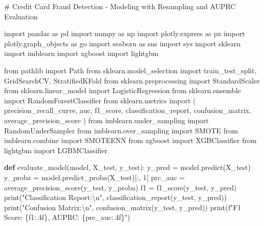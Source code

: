 \documentclass[
  letterpaper,
  DIV=11,
  numbers=noendperiod]{scrartcl}
\newenvironment{Shaded}{\begin{snugshade}}{\end{snugshade}}
\newcommand{\BuiltInTok}[1]{\textcolor[rgb]{0.00,0.23,0.31}{#1}}
\newcommand{\CharTok}[1]{\textcolor[rgb]{0.13,0.47,0.30}{#1}}
\newcommand{\CommentTok}[1]{\textcolor[rgb]{0.37,0.37,0.37}{#1}}
\newcommand{\DecValTok}[1]{\textcolor[rgb]{0.68,0.00,0.00}{#1}}
\newcommand{\ImportTok}[1]{\textcolor[rgb]{0.00,0.46,0.62}{#1}}
\newcommand{\KeywordTok}[1]{\textcolor[rgb]{0.00,0.23,0.31}{\textbf{#1}}}
\newcommand{\NormalTok}[1]{\textcolor[rgb]{0.00,0.23,0.31}{#1}}
\newcommand{\OperatorTok}[1]{\textcolor[rgb]{0.37,0.37,0.37}{#1}}
\newcommand{\SpecialCharTok}[1]{\textcolor[rgb]{0.37,0.37,0.37}{#1}}
\newcommand{\SpecialStringTok}[1]{\textcolor[rgb]{0.13,0.47,0.30}{#1}}
\newcommand{\StringTok}[1]{\textcolor[rgb]{0.13,0.47,0.30}{#1}}
\begin{document}
\begin{Shaded}
\begin{Highlighting}[]
\CommentTok{\# Credit Card Fraud Detection {-} Modeling with Resampling and AUPRC Evaluation}

\ImportTok{import}\NormalTok{ pandas }\ImportTok{as}\NormalTok{ pd}
\ImportTok{import}\NormalTok{ numpy }\ImportTok{as}\NormalTok{ np}
\ImportTok{import}\NormalTok{ plotly.express }\ImportTok{as}\NormalTok{ px}
\ImportTok{import}\NormalTok{ plotly.graph\_objects }\ImportTok{as}\NormalTok{ go}
\ImportTok{import}\NormalTok{ seaborn }\ImportTok{as}\NormalTok{ sns}
\ImportTok{import}\NormalTok{ sys}
\ImportTok{import}\NormalTok{ sklearn}
\ImportTok{import}\NormalTok{ imblearn}
\ImportTok{import}\NormalTok{ xgboost}
\ImportTok{import}\NormalTok{ lightgbm}

\ImportTok{from}\NormalTok{ pathlib }\ImportTok{import}\NormalTok{ Path}
\ImportTok{from}\NormalTok{ sklearn.model\_selection }\ImportTok{import}\NormalTok{ train\_test\_split, GridSearchCV, StratifiedKFold}
\ImportTok{from}\NormalTok{ sklearn.preprocessing }\ImportTok{import}\NormalTok{ StandardScaler}
\ImportTok{from}\NormalTok{ sklearn.linear\_model }\ImportTok{import}\NormalTok{ LogisticRegression}
\ImportTok{from}\NormalTok{ sklearn.ensemble }\ImportTok{import}\NormalTok{ RandomForestClassifier}
\ImportTok{from}\NormalTok{ sklearn.metrics }\ImportTok{import}\NormalTok{ (}
\NormalTok{    precision\_recall\_curve, auc, f1\_score, classification\_report, }
\NormalTok{    confusion\_matrix, average\_precision\_score}
\NormalTok{)}
\ImportTok{from}\NormalTok{ imblearn.under\_sampling }\ImportTok{import}\NormalTok{ RandomUnderSampler}
\ImportTok{from}\NormalTok{ imblearn.over\_sampling }\ImportTok{import}\NormalTok{ SMOTE}
\ImportTok{from}\NormalTok{ imblearn.combine }\ImportTok{import}\NormalTok{ SMOTEENN}
\ImportTok{from}\NormalTok{ xgboost }\ImportTok{import}\NormalTok{ XGBClassifier}
\ImportTok{from}\NormalTok{ lightgbm }\ImportTok{import}\NormalTok{ LGBMClassifier}


\KeywordTok{def}\NormalTok{ evaluate\_model(model, X\_test, y\_test):}
\NormalTok{    y\_pred }\OperatorTok{=}\NormalTok{ model.predict(X\_test)}
\NormalTok{    y\_proba }\OperatorTok{=}\NormalTok{ model.predict\_proba(X\_test)[:, }\DecValTok{1}\NormalTok{]}
\NormalTok{    prc\_auc }\OperatorTok{=}\NormalTok{ average\_precision\_score(y\_test, y\_proba)}
\NormalTok{    f1 }\OperatorTok{=}\NormalTok{ f1\_score(y\_test, y\_pred)}
    \BuiltInTok{print}\NormalTok{(}\StringTok{"Classification Report:}\CharTok{\textbackslash{}n}\StringTok{"}\NormalTok{, classification\_report(y\_test, y\_pred))}
    \BuiltInTok{print}\NormalTok{(}\StringTok{"Confusion Matrix:}\CharTok{\textbackslash{}n}\StringTok{"}\NormalTok{, confusion\_matrix(y\_test, y\_pred))}
    \BuiltInTok{print}\NormalTok{(}\SpecialStringTok{f"F1 Score: }\SpecialCharTok{\{}\NormalTok{f1}\SpecialCharTok{:.4f\}}\SpecialStringTok{, AUPRC: }\SpecialCharTok{\{}\NormalTok{prc\_auc}\SpecialCharTok{:.4f\}}\SpecialStringTok{"}\NormalTok{)}


\end{Highlighting}
\end{Shaded}
\end{document}
